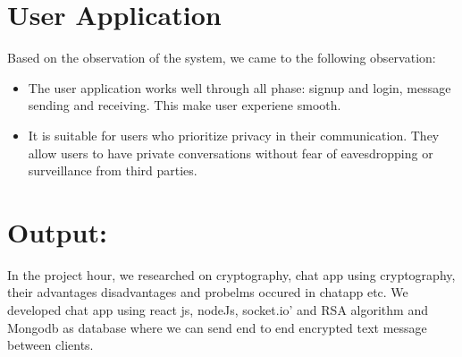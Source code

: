 \section{User Application}
Based on the observation of the system, we came to the following observation:
\vspace{-18pt}
\begin{itemize}
	\item The user application works well through all phase: signup and login, message sending and receiving. This make user experiene smooth.
	\item It is suitable for users who prioritize privacy in their communication. They allow users to have private conversations without fear of eavesdropping or surveillance from third parties.
\end{itemize}

\section{ Output:}
In the project hour, we researched on cryptography, chat app using cryptography, their advantages
disadvantages and probelms occured in chatapp etc. We developed chat app using react js, nodeJs, socket.io’
and RSA algorithm and Mongodb as database where we can send end to end encrypted text message between clients.



